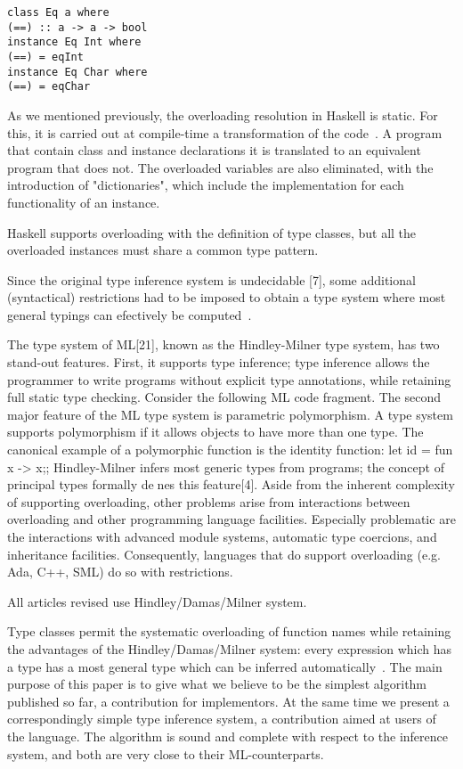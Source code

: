 \documentclass[hidelinks, twocolumn]{article}
\begin{document}
\texttt{class Eq a where\\
(==) :: a -> a -> bool\\
instance Eq Int where\\
(==) = eqInt\\
instance Eq Char where\\
(==) = eqChar \\}

As we mentioned previously, the overloading resolution in Haskell is static. For this, it is carried out 
at compile-time a transformation of the code~\cite{wadlerBlott:popl89}. A program that contain class and instance declarations it is translated to an equivalent program that does not. The overloaded variables are also eliminated, with the introduction of "dictionaries", which include the implementation for each functionality of an instance.   

Haskell supports overloading with the definition of type classes, but all the overloaded instances must share a common type pattern.

Since the original type inference system is undecidable [7], some additional (syntactical) restrictions had to be imposed to obtain a type system where most general typings can efectively be computed~\cite{SEIDL199457}.

The type system of ML[21], known as the Hindley-Milner type system, has two stand-out features. First, it supports type inference; type inference allows the programmer to write programs without explicit type annotations, while retaining full static type checking. Consider the following ML code fragment. The second major feature of the ML type system is parametric polymorphism. A type system supports polymorphism if it allows objects to have more than one type. The canonical example of a polymorphic function is the identity function:
let id = fun x -> x;; Hindley-Milner infers most generic types
from programs; the concept of principal types formally denes this feature[4].
Aside from the inherent complexity of supporting
overloading, other problems arise from interactions between overloading and
other programming language facilities. Especially problematic are the interactions
with advanced module systems, automatic type coercions, and inheritance facilities.
Consequently, languages that do support overloading (e.g. Ada, C++, SML) do so
with restrictions.

All articles revised use Hindley/Damas/Milner system.

Type classes permit the systematic overloading
of function names while retaining the advantages of the
Hindley/Damas/Milner system: every expression which
has a type has a most general type which can be inferred
automatically~\cite{Nipkow1993}. The main purpose of this paper is to give
what we believe to be the simplest algorithm published
so far, a contribution for implementors. At the same
time we present a correspondingly simple type inference
system, a contribution aimed at users of the language.
The algorithm is sound and complete with respect to
the inference system, and both are very close to their
ML-counterparts.
\end{document}
